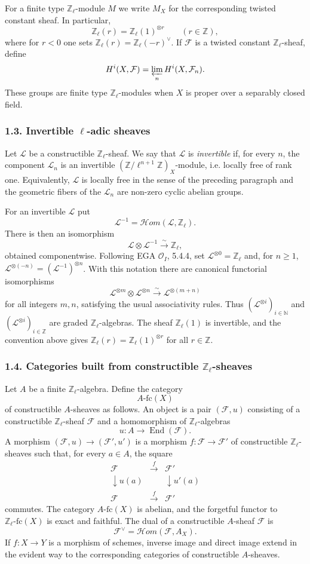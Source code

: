 \documentclass[12pt]{article}
\newcommand{\bZ}{\mathbb Z}
\newcommand{\bN}{\mathbb N}
\newcommand{\cF}{\mathcal F}
\newcommand{\cH}{\mathcal H}
\newcommand{\cL}{\mathcal L}
\newcommand{\End}{\operatorname{End}}
\newcommand{\fc}{\mathrm{fc}}
\begin{document}
For a finite type $\bZ_\ell$-module $M$ we write $M_X$ for the corresponding twisted
constant sheaf. In particular,
\[
       \bZ_\ell(r)=\bZ_\ell(1)^{\otimes r}\qquad(r\in\bZ),
\]
where for $r<0$ one sets $\bZ_\ell(r)=\bZ_\ell(-r)^{\vee}$. If $\cF$ is a twisted
constant $\bZ_\ell$-sheaf, define
\[
       H^i(X,\cF)=\varprojlim_n H^i(X,\cF_n).
\]
These groups are finite type $\bZ_\ell$-modules when $X$ is proper over a
separably closed field.

\subsubsection*{1.3. Invertible $\ell$-adic sheaves}

Let $\cL$ be a constructible $\bZ_\ell$-sheaf. We say that $\cL$ is \emph{invertible}
if, for every $n$, the component $\cL_n$ is an invertible
$(\bZ/\ell^{n+1}\bZ)_X$-module, i.e. locally free of rank one. Equivalently,
$\cL$ is locally free in the sense of the preceding paragraph and the geometric
fibers of the $\cL_n$ are non-zero cyclic abelian groups.

For an invertible $\cL$ put
\[
      \cL^{-1}=\cH om(\cL,\bZ_\ell).
\]
There is then an isomorphism
\[
      \cL\otimes\cL^{-1}\xrightarrow{\sim}\bZ_\ell,
\]
obtained componentwise. Following EGA $\mathcal O_I$, 5.4.4, set
$\cL^{\otimes0}=\bZ_\ell$ and, for $n\ge1$,
$\cL^{\otimes(-n)}=(\cL^{-1})^{\otimes n}$. With this notation there are canonical
functorial isomorphisms
\[
      \cL^{\otimes m}\otimes\cL^{\otimes n}\xrightarrow{\sim}
      \cL^{\otimes(m+n)}
\]
for all integers $m,n$, satisfying the usual associativity rules. Thus
$(\cL^{\otimes i})_{i\in\bN}$ and $(\cL^{\otimes i})_{i\in\bZ}$ are graded
$\bZ_\ell$-algebras. The sheaf $\bZ_\ell(1)$ is invertible, and the convention above
gives $\bZ_\ell(r)=\bZ_\ell(1)^{\otimes r}$ for all $r\in\bZ$.

\subsubsection*{1.4. Categories built from constructible $\bZ_\ell$-sheaves}

Let $A$ be a finite $\bZ_\ell$-algebra. Define the category
\[
       A\text{-}\fc(X)
\]
of constructible $A$-sheaves as follows. An object is a pair $(\cF,u)$ consisting of
a constructible $\bZ_\ell$-sheaf $\cF$ and a homomorphism of $\bZ_\ell$-algebras
\[
       u:A\longrightarrow \End(\cF).
\]
A morphism $(\cF,u)\to(\cF',u')$ is a morphism $f:\cF\to\cF'$ of constructible
$\bZ_\ell$-sheaves such that, for every $a\in A$, the square
\[
\begin{array}{ccc}
\cF&\xrightarrow{f}&\cF'\\
\downarrow\scriptstyle u(a)&&\downarrow\scriptstyle u'(a)\\
\cF&\xrightarrow{f}&\cF'
\end{array}
\]
commutes. The category $A\text{-}\fc(X)$ is abelian, and the forgetful functor to
$\bZ_\ell\text{-}\fc(X)$ is exact and faithful. The dual of a constructible
$A$-sheaf $\cF$ is
\[
       \cF^\vee=\cH om(\cF,A_X).
\]
If $f:X\to Y$ is a morphism of schemes, inverse image and direct image extend in
the evident way to the corresponding categories of constructible $A$-sheaves.
\end{document}
